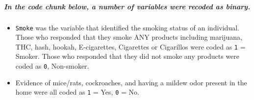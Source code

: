 \documentclass[]{article}
\providecommand{\tightlist}{%
  \setlength{\itemsep}{0pt}\setlength{\parskip}{0pt}}
\let\oldsubparagraph\subparagraph
\renewcommand{\subparagraph}[1]{\oldsubparagraph{#1}\mbox{}}
\begin{document}
\hypertarget{in-the-code-chunk-below-a-number-of-variables-were-recoded-as-binary.}{%
\subparagraph{In the code chunk below, a number of variables were
recoded as
binary.}\label{in-the-code-chunk-below-a-number-of-variables-were-recoded-as-binary.}}

\begin{itemize}
\tightlist
\item
  \texttt{Smoke} was the variable that identified the smoking status of
  an individual. Those who responded that they smoke ANY products
  including marijuana, THC, hash, hookah, E-cigarettes, Cigarettes or
  Cigarillos were coded as \texttt{1} = Smoker. Those who responded that
  they did not smoke any products were coded as \texttt{0}, Non-smoker.
\item
  Evidence of mice/rats, cockroaches, and having a mildew odor present
  in the home were all coded as \texttt{1} = Yes, \texttt{0} = No.
\end{itemize}
\end{document}
